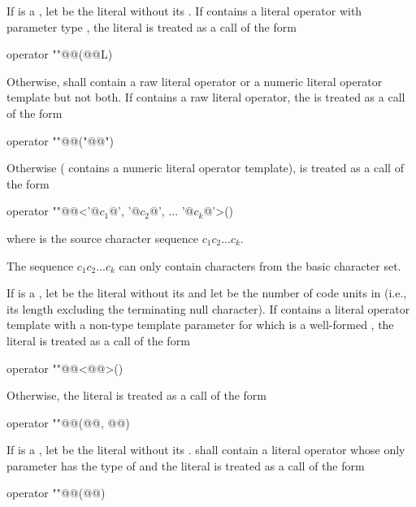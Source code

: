 \pnum
If  is a , let  be the
literal without its . If  contains a literal operator
with parameter type , the literal  is treated as a call of
the form
\begin{codeblock}
operator ""@@(@@L)
\end{codeblock}
Otherwise,  shall contain a raw literal operator
or a numeric literal operator template but not both.
If  contains a raw literal operator,
the   is treated as a call of the form
\begin{codeblock}
operator ""@@("@@")
\end{codeblock}
Otherwise ( contains a numeric literal operator template),
 is treated as a call of the form
\begin{codeblock}
operator ""@@<'@$c_1$@', '@$c_2$@', ... '@$c_k$@'>()
\end{codeblock}
where  is the source character sequence $c_1c_2...c_k$.
\begin{note}
The sequence
$c_1c_2...c_k$ can only contain characters from the basic character set.
\end{note}

\pnum
If  is a ,
let  be the literal without its 
and let  be the number of code units in 
(i.e., its length excluding the terminating null character).
If  contains a literal operator template with
a non-type template parameter for which  is
a well-formed ,
the literal  is treated as a call of the form
\begin{codeblock}
operator ""@@<@@>()
\end{codeblock}
Otherwise, the literal  is treated as a call of the form
\begin{codeblock}
operator ""@@(@@, @@)
\end{codeblock}

\pnum
If  is a , let  be the
literal without its .
 shall contain a literal operator whose only parameter has
the type of  and the
literal  is treated as a call
of the form
\begin{codeblock}
operator ""@@(@@)
\end{codeblock}

